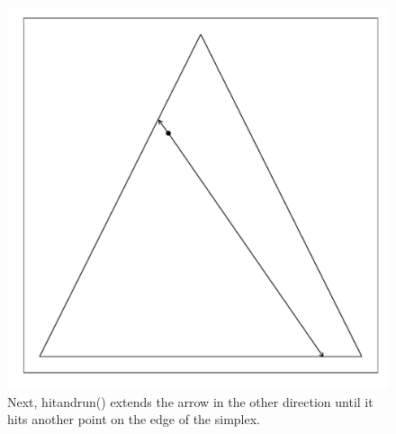 \documentclass{article}\usepackage{graphicx, color}
\makeatletter
\def\maxwidth{ %
  \ifdim\Gin@nat@width>\linewidth
    \linewidth
  \else
    \Gin@nat@width
  \fi
}
\newenvironment{knitrout}{}{} %
\makeatother
\begin{document}
\begin{figure}[H]
\begin{knitrout}
\color{fgcolor}
\includegraphics[width=\maxwidth]{figure/hitandrun_walkthrough4} 

\end{knitrout}

\caption{Next, hitandrun() extends the arrow in the other direction until it hits another point on the edge of the simplex.}
\end{figure}
\end{document}
